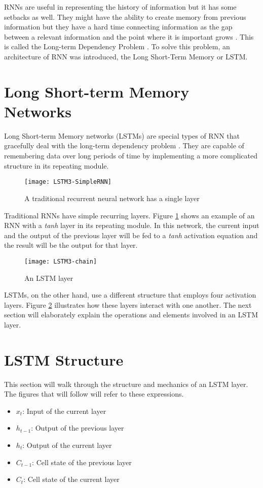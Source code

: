     RNNs are useful in representing the history of information but it has some setbacks as well. They might have the ability to create memory from previous information but they have a hard time connecting information as the gap between a relevant information and the point where it is important grows \citep{graves2012supervised}. This is called the Long-term Dependency Problem \citep{bengio1994learning}. To solve this problem, an architecture of RNN was introduced, the Long Short-Term Memory or LSTM.

\section{Long Short-term Memory Networks}
    Long Short-term Memory networks (LSTMs) are special types of RNN that gracefully deal with the long-term dependency problem \citep{hochreiter1997long}. They are capable of remembering data over long periods of time by implementing a more complicated structure in its repeating module.

    \begin{figure}[H]
    \centering
    \texttt{[image: LSTM3-SimpleRNN]}
    \caption{A traditional recurrent neural network has a single layer \citep{olah2015understanding}}
    \label{fig:rnn}
    \end{figure}
    Traditional RNNs have simple recurring layers. Figure \ref{fig:rnn} shows an example of an RNN with a \textit{tanh} layer in its repeating module. In this network, the current input and the output of the previous layer will be fed to a \textit{tanh} activation equation and the result will be the output for that layer.
    
    \begin{figure}[H]
    \centering
    \texttt{[image: LSTM3-chain]}
    \caption{An LSTM layer \citep{olah2015understanding}}
    \label{fig:chain}
    \end{figure}
    LSTMs, on the other hand, use a different structure that employs four activation layers. Figure \ref{fig:chain} illustrates how these layers interact with one another. The next section will elaborately explain the operations and elements involved in an LSTM layer.

\section{LSTM Structure}
    This section will walk through the structure and mechanics of an LSTM layer. The figures that will follow will refer to these expressions.
        \begin{itemize}
        \item \( x_t \): Input of the current layer
        \item \( h_{t-1} \): Output of the previous layer
        \item \( h_t \): Output of the current layer
        \item \( C_{t-1} \): Cell state of the previous layer
        \item \( C_t \): Cell state of the current layer
        \end{itemize}

